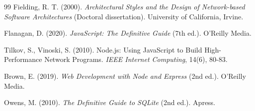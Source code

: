 \begin{thebibliography}{99}
Fielding, R. T. (2000). 
\textit{Architectural Styles and the Design of Network-based Software 
Architectures} (Doctoral dissertation). 
University of California, Irvine.

Flanagan, D. (2020). 
\textit{JavaScript: The Definitive Guide} (7th ed.). 
O'Reilly Media.

Tilkov, S., Vinoski, S. (2010). 
Node.js: Using JavaScript to Build High-Performance Network Programs. 
\textit{IEEE Internet Computing}, 14(6), 80-83.

Brown, E. (2019). 
\textit{Web Development with Node and Express} (2nd ed.). 
O'Reilly Media.

Owens, M. (2010). 
\textit{The Definitive Guide to SQLite} (2nd ed.). 
Apress.

\end{thebibliography}
